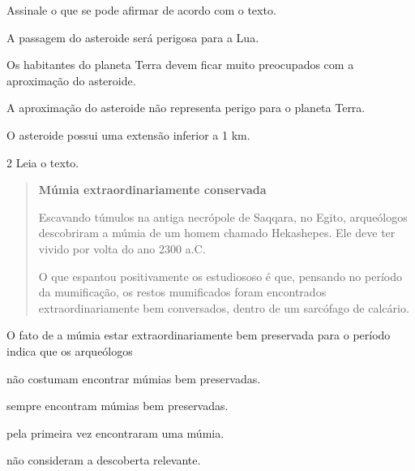 Assinale o que se pode afirmar de acordo com o texto.

\begin{escolha}
\item A passagem do asteroide será perigosa para a Lua.

\item Os habitantes do planeta Terra devem ficar muito preocupados com a
aproximação do asteroide.

\item A aproximação do asteroide não representa perigo para o planeta
Terra.

\item O asteroide possui uma extensão inferior a 1 km.
\end{escolha}


\num{2} Leia o texto.

\begin{quote}
\textbf{Múmia extraordinariamente conservada}

Escavando túmulos na antiga necrópole de Saqqara, no Egito, arqueólogos descobriram a múmia de um homem chamado Hekashepes. Ele deve ter vivido por volta do ano 2300 a.C.

O que espantou positivamente os estudiososo é que, pensando no período da mumificação, os restos mumificados foram encontrados extraordinariamente bem conversados, dentro de um sarcófago de calcário.

\end{quote}

O fato de a múmia estar extraordinariamente bem preservada para o período
indica que os arqueólogos

\begin{escolha}
\item não costumam encontrar múmias bem preservadas.

\item sempre encontram múmias bem preservadas.

\item pela primeira vez encontraram uma múmia.

\item não consideram a descoberta relevante.
\end{escolha}

